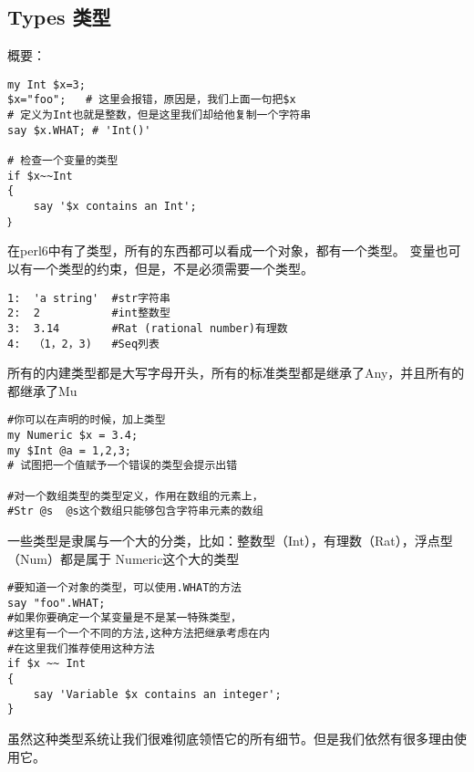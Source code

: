 \documentclass{ctexart}
\begin{document}
\subsection{Types 类型}
\label{sec-4-3}

概要：

\begin{lstlisting}
my Int $x=3;
$x="foo";   # 这里会报错，原因是，我们上面一句把$x 
# 定义为Int也就是整数，但是这里我们却给他复制一个字符串
say $x.WHAT; # 'Int()'

# 检查一个变量的类型
if $x~~Int
{
    say '$x contains an Int';
｝
\end{lstlisting}
在perl6中有了类型，所有的东西都可以看成一个对象，都有一个类型。
变量也可以有一个类型的约束，但是，不是必须需要一个类型。

\begin{lstlisting}
1:  'a string'  #str字符串
2:  2           #int整数型
3:  3.14        #Rat (rational number)有理数
4:  （1，2，3)   #Seq列表
\end{lstlisting}
所有的内建类型都是大写字母开头，所有的标准类型都是继承了Any，并且所有的都继承了Mu


\begin{lstlisting}
#你可以在声明的时候，加上类型
my Numeric $x = 3.4;
my $Int @a = 1,2,3;
# 试图把一个值赋予一个错误的类型会提示出错

#对一个数组类型的类型定义，作用在数组的元素上，
#Str @s  @s这个数组只能够包含字符串元素的数组
\end{lstlisting}
一些类型是隶属与一个大的分类，比如：整数型（Int），有理数（Rat），浮点型（Num）都是属于
Numeric这个大的类型


\begin{lstlisting}
#要知道一个对象的类型，可以使用.WHAT的方法
say "foo".WHAT;
#如果你要确定一个某变量是不是某一特殊类型，
#这里有一个一个不同的方法,这种方法把继承考虑在内
#在这里我们推荐使用这种方法
if $x ~~ Int
{
    say 'Variable $x contains an integer';
}
\end{lstlisting}
虽然这种类型系统让我们很难彻底领悟它的所有细节。但是我们依然有很多理由使用它。
\end{document}
